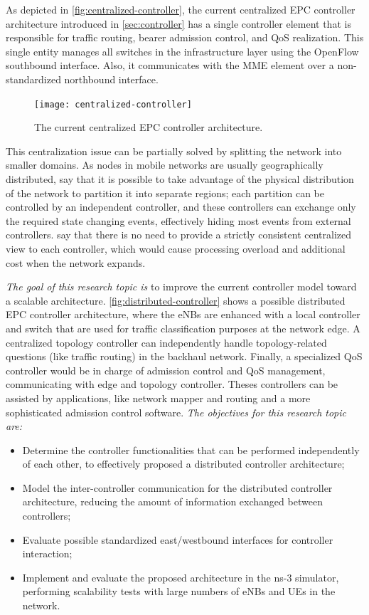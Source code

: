As depicted in \autoref{fig:centralized-controller}, the current centralized
\ac{EPC} controller architecture introduced in \autoref{sec:controller} has a
single controller element that is responsible for traffic routing, bearer
admission control, and \ac{QoS} realization. This single entity manages all
switches in the infrastructure layer using the OpenFlow southbound interface.
Also, it communicates with the \ac{MME} element over a non-standardized
northbound interface.
\begin{figure}[htb]
  \centering
  \texttt{[image: centralized-controller]}
  \caption{The current centralized \acs{EPC} controller architecture.}
  \label{fig:centralized-controller}
\end{figure}
This centralization issue can be partially solved by splitting the network into
smaller domains. As nodes in mobile networks are usually geographically
distributed, \citet{Yeganeh2013} say that it is possible to take advantage of
the physical distribution of the network to partition it into separate regions;
each partition can be controlled by an independent controller, and these
controllers can exchange only the required state changing events, effectively
hiding most events from external controllers. \citet{Yang2015a} say that there
is no need to provide a strictly consistent centralized view to each
controller, which would cause processing overload and additional cost when the
network expands.

\emph{The goal of this research topic is} to improve the current controller
model toward a scalable architecture. \autoref{fig:distributed-controller}
shows a possible distributed \ac{EPC} controller architecture, where the
\acp{eNB} are enhanced with a local controller and switch that are used for
traffic classification purposes at the network edge. A centralized topology
controller can independently handle topology-related questions (like traffic
routing) in the backhaul network. Finally, a specialized \ac{QoS} controller
would be in charge of admission control and \ac{QoS} management, communicating
with edge and topology controller. Theses controllers can be assisted by
applications, like network mapper and routing and a more sophisticated
admission control software. 
\emph{The objectives for this research topic are:}
\begin{itemize}
  \item Determine the controller functionalities that can be performed
  independently of each other, to effectively proposed a distributed controller
  architecture;

  \item Model the inter-controller communication for the distributed controller
  architecture, reducing the amount of information exchanged between
  controllers;

  \item Evaluate possible standardized east/westbound interfaces for controller
  interaction;

  \item Implement and evaluate the proposed architecture in the \ac{ns-3}
  simulator, performing scalability tests with large numbers of \acp{eNB} and
  \acp{UE} in the network.
\end{itemize}

